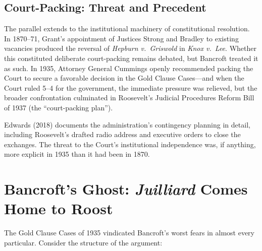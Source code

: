 \documentclass[12pt]{article}
\begin{document}
\subsection{Court-Packing: Threat and Precedent}

The parallel extends to the institutional machinery of constitutional
resolution. In 1870--71, Grant's appointment of Justices Strong and
Bradley to existing vacancies produced the reversal of \textit{Hepburn
v.\ Griswold} in \textit{Knox v.\ Lee}. Whether this constituted
deliberate court-packing remains debated, but Bancroft treated it as
such. In 1935, Attorney General Cummings openly recommended packing the
Court to secure a favorable decision in the Gold Clause Cases---and
when the Court ruled 5--4 for the government, the immediate pressure
was relieved, but the broader confrontation culminated in Roosevelt's
Judicial Procedures Reform Bill of 1937 (the ``court-packing plan'').

Edwards (2018) documents the administration's contingency planning in
detail, including Roosevelt's drafted radio address and executive
orders to close the exchanges. The threat to the Court's institutional
independence was, if anything, more explicit in 1935 than it had been
in 1870.

\section{Bancroft's Ghost: \textit{Juilliard} Comes Home to Roost}

The Gold Clause Cases of 1935 vindicated Bancroft's worst fears in
almost every particular. Consider the structure of the argument:
\end{document}
